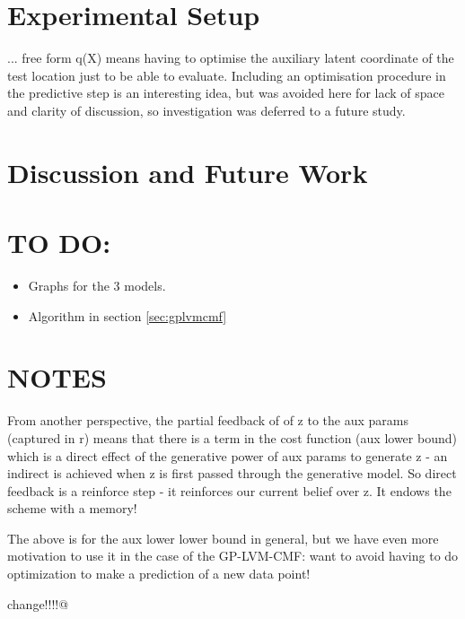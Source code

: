 \documentclass{article}
\begin{document}
\section{Experimental Setup}
\label{sec:experiments}

... free form q(X) means having to optimise the auxiliary latent coordinate of the test location just to be able to evaluate. Including an optimisation procedure in the predictive step is an interesting idea, but was avoided here for lack of space and clarity of discussion, so investigation was deferred to a future study.

\section{Discussion and Future Work}
\label{sec:discussion}

\section{TO DO:}
\begin{itemize}
  \item Graphs for the 3 models.
  \item Algorithm in section \ref{sec:gplvmcmf}
\end{itemize}

\section{NOTES}

From another perspective, the partial feedback of of z to the aux params (captured in r) means that there is a term in the cost function (aux lower bound) which is a direct effect of the generative power of aux params to generate z - an indirect is achieved when z is first passed through the generative model. So direct feedback is a reinforce step - it reinforces our current belief over z. It endows the scheme with a memory!

The above is for the aux lower lower bound in general, but we have even more motivation to use it in the case of the GP-LVM-CMF: want to avoid having to do optimization to make a prediction of a new data point!

change!!!!@
\end{document}
